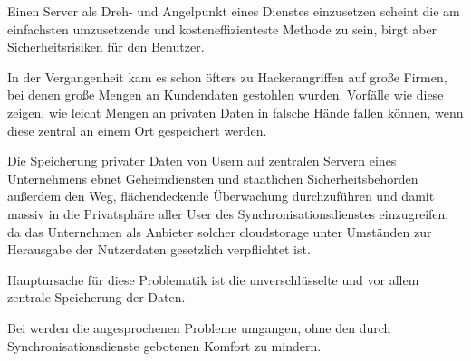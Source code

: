 Einen Server als Dreh- und Angelpunkt eines Dienstes einzusetzen scheint die am
einfachsten umzusetzende und kosteneffizienteste Methode zu sein, birgt aber Sicherheitsrisiken
für den Benutzer.

In der Vergangenheit kam es schon öfters zu Hackerangriffen auf große Firmen, bei
denen große Mengen an Kundendaten gestohlen wurden. Vorfälle wie diese zeigen, wie leicht
Mengen an privaten Daten in falsche Hände fallen können, wenn diese zentral an einem Ort
gespeichert werden.

Die Speicherung privater Daten von Usern auf zentralen Servern eines Unternehmens ebnet
Geheimdiensten und staatlichen Sicherheitsbehörden außerdem den Weg, flächendeckende Überwachung
durchzuführen und damit massiv in die Privatsphäre aller User des Synchronisationsdienstes
einzugreifen, da das Unternehmen als Anbieter solcher \gls{cloudstorage} unter Umständen zur
Herausgabe der Nutzerdaten gesetzlich verpflichtet ist.

Hauptursache für diese Problematik ist die unverschlüsselte und vor allem zentrale
Speicherung der Daten.

Bei \sblit werden die angesprochenen Probleme umgangen, ohne den durch Synchronisationsdienste
gebotenen Komfort zu mindern.
